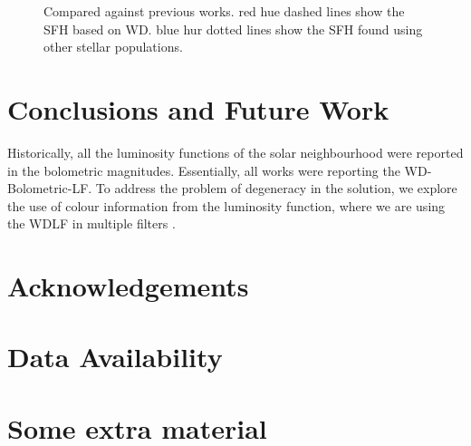 \documentclass[fleqn,usenatbib]{mnras}
\newcommand{\dummyfig}[1]{
  \centering
  \fbox{
    \begin{minipage}[c][0.25\textheight][c]{\columnwidth}
      \centering{#1}
    \end{minipage}
  }
}
\begin{document}
\begin{figure}
  \dummyfig{Comparison} 
  \caption{Compared against previous works. red hue dashed lines show the SFH based on WD. blue hur dotted lines show the SFH found using other stellar populations.}
  \label{fig:dummy3}
\end{figure}


\section{Conclusions and Future Work}
Historically, all the luminosity functions of the solar neighbourhood were reported
in the bolometric magnitudes. Essentially, all works were reporting the
WD-Bolometric-LF. To address the problem of degeneracy in the solution, we explore
the use of colour information from the luminosity function, where we are using
the WDLF in multiple filters . 



\section*{Acknowledgements}


\section*{Data Availability}










\appendix

\section{Some extra material}



\bsp	%
\label{lastpage}
\end{document}
